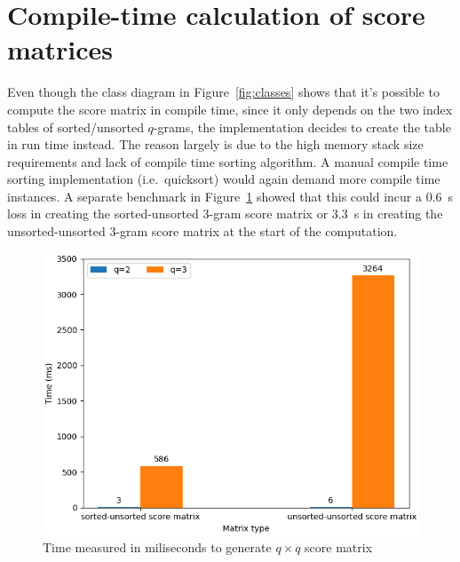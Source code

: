 \documentclass[twoside,a4paper,bsc]{master}
\newcommand{\Qgram}[1]{\(#1\)-gram}
\begin{document}
\section{Compile-time calculation of
score matrices\label{section:scorematrix}}
Even though the class diagram in Figure~\ref{fig:classes} shows that it's
possible to compute the score matrix in compile time, since it only depends
on the two index tables of sorted/unsorted \Qgram{q}s, the implementation
decides to create the table in run time instead. The reason largely is due
to the high memory stack size requirements and lack of compile time sorting
algorithm. A manual compile time sorting implementation (i.e.\ quicksort)
would again demand more compile time instances. A separate benchmark in
Figure~\ref{fig:scorematrix} showed that this could incur a 0.6~s loss in
creating the sorted-unsorted \Qgram{3} score matrix or 3.3~s in creating
the unsorted-unsorted \Qgram{3} score matrix at the start of the
computation.
\begin{figure}
\centering
\includegraphics[scale=0.7]{graphics/scorematrix.png}
\caption{Time measured in miliseconds to generate \(q\times q\) score
matrix}
\label{fig:scorematrix}
\end{figure}
\end{document}

